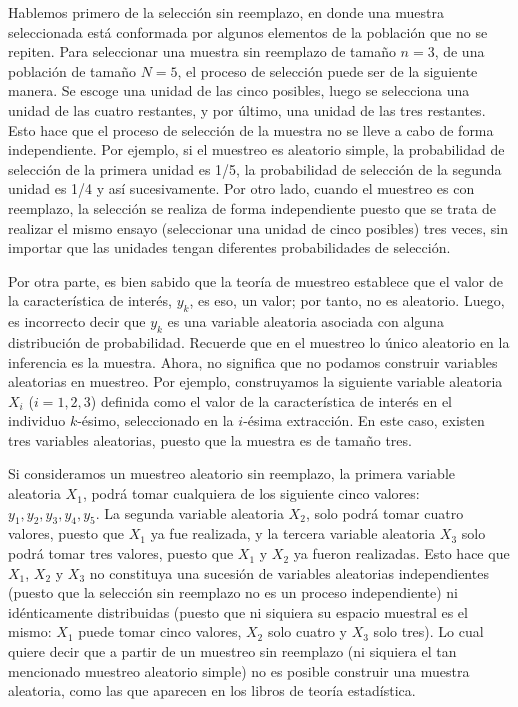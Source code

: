\documentclass[
  spanish,
  12pt,
]{book}
\begin{document}
Hablemos primero de la selección sin reemplazo, en donde una muestra seleccionada está conformada por algunos elementos de la población que no se repiten. Para seleccionar una muestra sin reemplazo de tamaño \(n=3\), de una población de tamaño \(N=5\), el proceso de selección puede ser de la siguiente manera. Se escoge una unidad de las cinco posibles, luego se selecciona una unidad de las cuatro restantes, y por último, una unidad de las tres restantes. Esto hace que el proceso de selección de la muestra no se lleve a cabo de forma independiente. Por ejemplo, si el muestreo es aleatorio simple, la probabilidad de selección de la primera unidad es 1/5, la probabilidad de selección de la segunda unidad es 1/4 y así sucesivamente. Por otro lado, cuando el muestreo es con reemplazo, la selección se realiza de forma independiente puesto que se trata de realizar el mismo ensayo (seleccionar una unidad de cinco posibles) tres veces, sin importar que las unidades tengan diferentes probabilidades de selección.

Por otra parte, es bien sabido que la teoría de muestreo establece que el valor de la característica de interés, \(y_k\), es eso, un valor; por tanto, no es aleatorio. Luego, es incorrecto decir que \(y_k\) es una variable aleatoria asociada con alguna distribución de probabilidad. Recuerde que en el muestreo lo único aleatorio en la inferencia es la muestra. Ahora, no significa que no podamos construir variables aleatorias en muestreo. Por ejemplo, construyamos la siguiente variable aleatoria \(X_i\) (\(i=1,2,3\)) definida como el valor de la característica de interés en el individuo \(k\)-ésimo, seleccionado en la \(i\)-ésima extracción. En este caso, existen tres variables aleatorias, puesto que la muestra es de tamaño tres.

Si consideramos un muestreo aleatorio sin reemplazo, la primera variable aleatoria \(X_1\), podrá tomar cualquiera de los siguiente cinco valores: \(y_1, y_2, y_3, y_4, y_5\). La segunda variable aleatoria \(X_2\), solo podrá tomar cuatro valores, puesto que \(X_1\) ya fue realizada, y la tercera variable aleatoria \(X_3\) solo podrá tomar tres valores, puesto que \(X_1\) y \(X_2\) ya fueron realizadas. Esto hace que \(X_1\), \(X_2\) y \(X_3\) no constituya una sucesión de variables aleatorias independientes (puesto que la selección sin reemplazo no es un proceso independiente) ni idénticamente distribuidas (puesto que ni siquiera su espacio muestral es el mismo: \(X_1\) puede tomar cinco valores, \(X_2\) solo cuatro y \(X_3\) solo tres). Lo cual quiere decir que a partir de un muestreo sin reemplazo (ni siquiera el tan mencionado muestreo aleatorio simple) no es posible construir una muestra aleatoria, como las que aparecen en los libros de teoría estadística.
\end{document}
